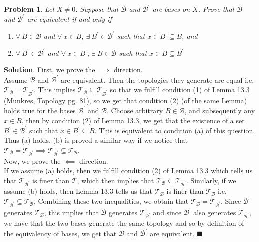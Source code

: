 \documentclass[12pt]{article}
\renewcommand{\=}[1]{\stackrel{#1}{=}} %
\providecommand{\T}{\mathcal{T}}
\newtheorem{p}{Problem}[section]
\theoremstyle{definition}
\newenvironment{s}{%
        \begin{trivlist} \item \textbf{Solution}. }{%
            \hspace*{\fill} $\blacksquare$\end{trivlist}}%
\begin{document}
\begin{p}
    Let $X\neq 0$. Suppose that $\mathcal{B}$ and $\mathcal{B}^{'}$ are bases on $X$. Prove that $\mathcal{B}$ and $\mathcal{B}^{'}$
    are equivalent if and only if
    \begin{enumerate}
        \item[(a)] $\forall\: B\in\mathcal{B}$ and $\forall\:x\in B$, $\exists\:B^{'}\in\mathcal{B}^{'}$ such that $x\in B^{'}\subseteq B$, and
        \item[(b)] $\forall\: B^{'}\in\mathcal{B}^{'}$ and $\forall\:x\in B^{'}$, $\exists\:B\in\mathcal{B}$ such that $x\in B\subseteq B^{'}$
    \end{enumerate}
\end{p}
\begin{s}
    First, we prove the $\implies$ direction.\\
    Assume $\mathcal{B}$ and $\mathcal{B}^{'}$ are equivalent. Then the topologies they generate are equal i.e. $\T_{\mathcal{B}} = 
    \T_{\mathcal{B}^{'}}$. This implies $\T_{\mathcal{B}} \subseteq \T_{\mathcal{B}^{'}}$ so that we fulfill condition (1) of
    Lemma 13.3 (Munkres, Topology pg. 81), so we get that condition (2) (of the same Lemma) holds true for the bases $\mathcal{B}^{'}$ and
    $\mathcal{B}$. Choose arbitrary $B\in\mathcal{B}$, and subsequently any $x\in B$, then by condition (2) of Lemma 13.3, we get that
    the existence of a set $B^{'}\in\mathcal{B}^{'}$ such that $x\in B^{'}\subseteq B$. This is equivalent to condition (a) of this question.
    Thus (a) holds. (b) is proved a similar way if we notice that $\T_{\mathcal{B}} = \T_{\mathcal{B}^{'}} \implies \T_{\mathcal{B}^{'}} \subseteq
    \T_{\mathcal{B}}$.\\
    Now, we prove the $\impliedby$ direction.\\
    If we assume (a) holds, then we fulfill condition (2) of Lemma 13.3 which tells us that $\T_{\mathcal{B}^{'}}$ is finer than $\T$, 
    which then implies that $\T_{\mathcal{B}} \subseteq \T_{\mathcal{B}^{'}}$. 
    Similarly, if we assume (b) holds, then Lemma 13.3 tells us that $\T_{\mathcal{B}}$ is finer than $\T_{\mathcal{B}}$ 
    i.e. $\T_{\mathcal{B}^{'}} \subseteq \T_{\mathcal{B}}$.
    Combining these two inequalities, we obtain that $\T_{\mathcal{B}} = \T_{\mathcal{B}^{'}}$. Since $\mathcal{B}$ generates $\T_{\mathcal{B}}$,
    this implies that $\mathcal{B}$ generates
    $\T_{\mathcal{B}^{'}}$ and since $\mathcal{B}^{'}$ also generates $\T_{\mathcal{B}^{'}}$, we have that the two bases generate the same topology
    and so by definition of the equivalency of bases, we get that $\mathcal{B}$ and $\mathcal{B}^{'}$ are equivalent.
\end{s}
\end{document}
